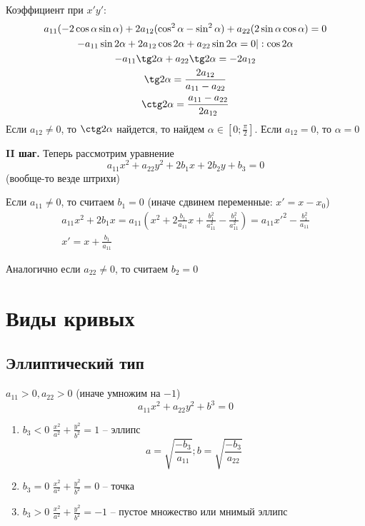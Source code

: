 Коэффициент при $x'y'$:
\begin{gather*}
    a_{11}(-2\cos\alpha\sin\alpha) + 2 a_{12} (\cos^2 \alpha - \sin^2 \alpha)
    + a_{22}(2\sin\alpha \cos\alpha) = 0\\
    -a_{11} \sin 2\alpha + 2a_{12} \cos 2\alpha + a_{22} \sin 2 \alpha=0 |:\cos2\alpha\\
    -a_{11} \tg 2 \alpha + a_{22} \tg 2 \alpha = -2 a_{12}\\
    \tg 2 \alpha = \frac{2 a_{12}}{a_{11} - a_{22}}\\
    \ctg 2 \alpha = \frac{a_{11} - a_{22}}{2a_{12}}
\end{gather*}
Если $a_{12} \neq 0$, то $\ctg 2 \alpha$ найдется, то найдем $\alpha \in \left[0; \frac{\pi}{2}\right]$.
Если $a_{12} = 0$, то $\alpha = 0$

\textbf{II шаг. } Теперь рассмотрим уравнение
\[a_{11} x^2 + a_{22} y^2 + 2b_1 x + 2 b_2y +b_3 = 0\]
(вообще-то везде штрихи)

\begin{lemma}
    Если $a_{11} \neq 0$, то считаем $b_1 = 0$ (иначе сдвинем переменные: $x' = x - x_0$)
    \begin{gather*}
        a_{11} x^2 + 2 b_1 x =
        a_{11}\left(x^2+2\frac{b_1}{a_{11}}x + \frac{b_1^2}{a_{11}^2} -  \frac{b_1^2}{a_{11}^2}\right) =
        a_{11} x'^2 - \frac{b_1^2}{a_{11}}\\
        x' = x + \frac{b_1}{a_{11}}
    \end{gather*}

    Аналогично если $a_{22} \neq 0 $, то считаем $b_2=0$
\end{lemma}

\section{Виды кривых}
\subsection{Эллиптический тип}
$a_{11}>0, a_{22} > 0$ (иначе умножим на $-1$)
\[a_{11} x^2 + a_{22} y^2 + b^3 = 0\]
\begin{enumerate}
    \item $b_3 < 0$ $ \frac{x^2}{a^2} + \frac{y^2}{b^2} = 1$ -- эллипс
          \[a = \sqrt{\frac{-b_3}{a_{11}}}; b = \sqrt{\frac{-b_3}{a_{22}}}\]
    \item $b_3 = 0$ $ \frac{x^2}{a^2} + \frac{y^2}{b^2} = 0$ -- точка
    \item $b_3> 0$ $ \frac{x^2}{a^2} + \frac{y^2}{b^2} = -1$ -- пустое множество или мнимый эллипс
\end{enumerate}

